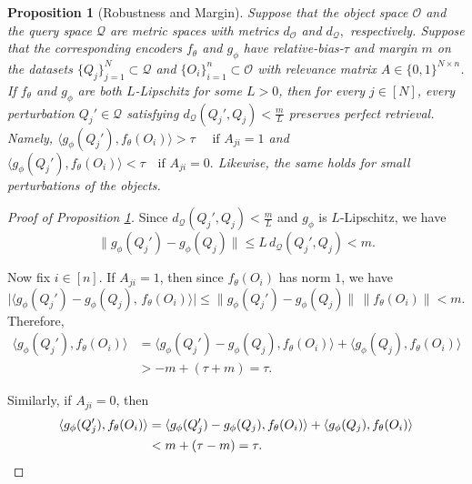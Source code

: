 \documentclass[preprint]{article}
\newtheorem{proposition}{Proposition}[]
\begin{document}
\begin{proposition}[Robustness and Margin]
\label{prop:marginrobustness}
Suppose that the object space $\mathcal{O}$ and the query space $\mathcal{Q}$ are metric spaces with metrics $d_{\mathcal{O}}$ and $d_{\mathcal{Q}},$ respectively. Suppose that the corresponding encoders $f_\theta$ and $g_\phi$ have relative-bias-$\tau$ and margin $m$ on the datasets $\{Q_j\}_{j=1}^N \subset \mathcal{Q}$ and $ \{O_i\}_{i=1}^n \subset \mathcal{O}$ with relevance matrix $A\in \{0,1\}^{N\times n}$.  If $f_\theta$ and $g_\phi$ are both $L$-Lipschitz for some $L > 0$, then for every $j\in[N]$, every perturbation $Q_j' \in \mathcal{Q}$ satisfying
$
d_{\mathcal{Q}}(Q_j',Q_j)<\frac{m}{L}
$
preserves perfect retrieval. Namely,
$
\langle g_\phi(Q_j'), f_\theta(O_i)\rangle > \tau \quad \text { if } A_{ji}=1
$ and 
$
\langle g_\phi(Q_j'), f_\theta(O_i)\rangle < \tau \quad \text{if } A_{ji}=0.
$ Likewise, the same holds for small perturbations of the objects.
\end{proposition}
\begin{proof}[Proof of Proposition \ref{prop:marginrobustness}]

Since $d_{\mathcal{Q}}(Q_j',Q_j)< \frac{m}{L}$ and $g_\phi$ is $L$-Lipschitz, we have
\[
\|g_\phi(Q_j')-g_\phi(Q_j)\|
\leq L\, d_{\mathcal{Q}}(Q_j',Q_j)
< m.
\]

Now fix $i\in[n]$. If $A_{ji}=1$, then since $f_\theta(O_i)$ has norm $1$, we have
\[
\bigl|\langle g_\phi(Q_j')-g_\phi(Q_j),\, f_\theta(O_i)\rangle\bigr|
\leq \|g_\phi(Q_j')-g_\phi(Q_j)\|\,\|f_\theta(O_i)\|
< m.
\]
Therefore,
\begin{align*}
\langle g_\phi(Q_j'), f_\theta(O_i)\rangle
&=
\langle g_\phi(Q_j')-g_\phi(Q_j), f_\theta(O_i)\rangle
+
\langle g_\phi(Q_j), f_\theta(O_i)\rangle \\
&> -m + (\tau + m) = \tau.
\end{align*}

Similarly, if $A_{ji}=0$, then
\begin{align*}
\langle g_\phi(Q_j'), f_\theta(O_i)\rangle
&=
\langle g_\phi(Q_j')-g_\phi(Q_j), f_\theta(O_i)\rangle
+
\langle g_\phi(Q_j), f_\theta(O_i)\rangle \\
&< m + (\tau - m) = \tau.\qedhere
\end{align*}
\end{proof}
\end{document}
